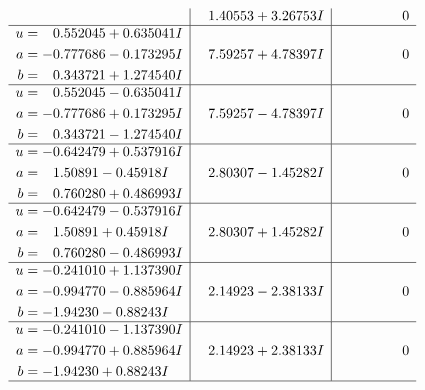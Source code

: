 \documentclass[1p]{elsarticle_modified}
\theoremstyle{definition}
\begin{document}
$$\begin{array}{c|c|c}
 & \phantom{-}1.40553 + 3.26753 I & \phantom{-0.000000 } 0 \\ \hline\begin{aligned}
u &= \phantom{-}0.552045 + 0.635041 I \\
a &= -0.777686 - 0.173295 I \\
b &= \phantom{-}0.343721 + 1.274540 I\end{aligned}
 & \phantom{-}7.59257 + 4.78397 I & \phantom{-0.000000 } 0 \\ \hline\begin{aligned}
u &= \phantom{-}0.552045 - 0.635041 I \\
a &= -0.777686 + 0.173295 I \\
b &= \phantom{-}0.343721 - 1.274540 I\end{aligned}
 & \phantom{-}7.59257 - 4.78397 I & \phantom{-0.000000 } 0 \\ \hline\begin{aligned}
u &= -0.642479 + 0.537916 I \\
a &= \phantom{-}1.50891 - 0.45918 I \\
b &= \phantom{-}0.760280 + 0.486993 I\end{aligned}
 & \phantom{-}2.80307 - 1.45282 I & \phantom{-0.000000 } 0 \\ \hline\begin{aligned}
u &= -0.642479 - 0.537916 I \\
a &= \phantom{-}1.50891 + 0.45918 I \\
b &= \phantom{-}0.760280 - 0.486993 I\end{aligned}
 & \phantom{-}2.80307 + 1.45282 I & \phantom{-0.000000 } 0 \\ \hline\begin{aligned}
u &= -0.241010 + 1.137390 I \\
a &= -0.994770 - 0.885964 I \\
b &= -1.94230 - 0.88243 I\end{aligned}
 & \phantom{-}2.14923 - 2.38133 I & \phantom{-0.000000 } 0 \\ \hline\begin{aligned}
u &= -0.241010 - 1.137390 I \\
a &= -0.994770 + 0.885964 I \\
b &= -1.94230 + 0.88243 I\end{aligned}
 & \phantom{-}2.14923 + 2.38133 I & \phantom{-0.000000 } 0\\
 \hline 
 \end{array}$$\newpage$$\begin{array}{c|c|c}  

\end{array}$$
\end{document}
